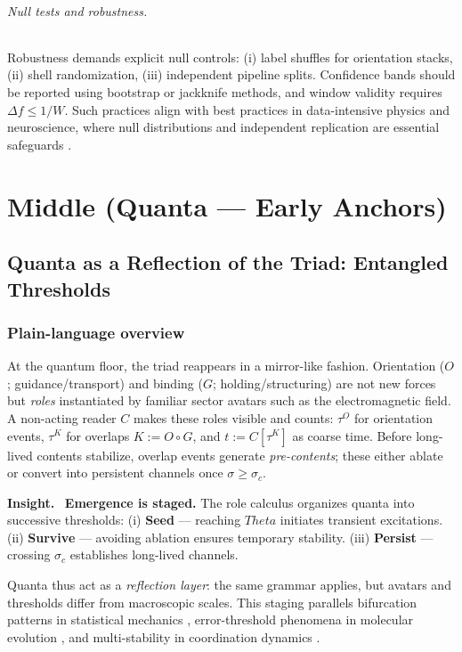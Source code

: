 \documentclass[12pt,a4paper,oneside]{scrreprt}
\def\Theta{Theta}%
\newenvironment{insight}{\par\vspace{0.5em}\noindent\textbf{Insight.}\ }{\par\vspace{0.5em}}
\begin{document}
\paragraph{Null tests and robustness.} 
Robustness demands explicit null controls:  
(i) label shuffles for orientation stacks,  
(ii) shell randomization,  
(iii) independent pipeline splits.  
Confidence bands should be reported using bootstrap or jackknife methods, 
and window validity requires $\Delta f \leq 1/W$. 
Such practices align with best practices in data-intensive physics and neuroscience, 
where null distributions and independent replication are essential safeguards 
\citep{Efron1993Bootstrap,Good2005Permutation}.

\part{Middle (Quanta — Early Anchors)}

\chapter{Quanta as a Reflection of the Triad: Entangled Thresholds}\label{ch:quanta-triad}

\section*{Plain-language overview}

At the quantum floor, the triad reappears in a mirror-like fashion. 
Orientation ($O$; guidance/transport) and binding ($G$; holding/structuring) are not 
new forces but \emph{roles} instantiated by familiar sector avatars such as the 
electromagnetic field. 
A non-acting reader $C$ makes these roles visible and counts: 
$\tau^O$ for orientation events, $\tau^K$ for overlaps $K := O \!\circ G$, 
and $t := C[\tau^K]$ as coarse time. 
Before long-lived contents stabilize, overlap events generate \emph{pre-contents}; 
these either ablate or convert into persistent channels once $\sigma \geq \sigma_c$. 

\begin{insight}
\textbf{Emergence is staged.} 
The role calculus organizes quanta into successive thresholds:  
(i) \textbf{Seed} --- reaching $\Theta$ initiates transient excitations.  
(ii) \textbf{Survive} --- avoiding ablation ensures temporary stability.  
(iii) \textbf{Persist} --- crossing $\sigma_c$ establishes long-lived channels.  

Quanta thus act as a \emph{reflection layer}: the same grammar applies, 
but avatars and thresholds differ from macroscopic scales. 
This staging parallels bifurcation patterns in statistical mechanics 
\citep{Stanley1971Phase}, error-threshold phenomena in molecular evolution 
\citep{Eigen1971,Szathmary1995}, and multi-stability in coordination dynamics 
\citep{Kelso1995Coordination}.
\end{insight}
\end{document}
